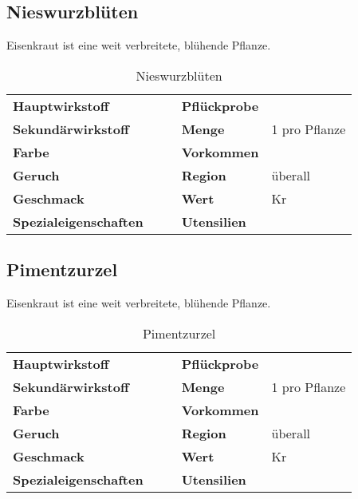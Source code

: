\subsection{Nieswurzblüten}
Eisenkraut ist eine weit verbreitete, blühende Pflanze. 

\begin{table}[h]
\begin{center}
\begin{tabular}{|l|l|p{1cm}|l|l|}
	\cline{1-2} \cline{4-5}
	\textbf{Hauptwirkstoff} &  && \textbf{Pflückprobe} &  \\ \cline{1-2} \cline{4-5}
	\textbf{Sekundärwirkstoff} &  && \textbf{Menge} & 1 pro Pflanze \\ \cline{1-2} \cline{4-5}
	\textbf{Farbe} &  && \textbf{Vorkommen} &  \\ \cline{1-2} \cline{4-5}
	\textbf{Geruch} &  && \textbf{Region} & überall \\ \cline{1-2} \cline{4-5}
	\textbf{Geschmack} &  && \textbf{Wert} & Kr \\ \cline{1-2} \cline{4-5}
	\textbf{Spezialeigenschaften} &  && \textbf{Utensilien} &  \\ \cline{1-2} \cline{4-5}
\end{tabular}
\end{center}
\caption{Nieswurzblüten}
\label{tab:nieswurzblueten}
\end{table}


\subsection{Pimentzurzel}
Eisenkraut ist eine weit verbreitete, blühende Pflanze. 

\begin{table}[h]
\begin{center}
\begin{tabular}{|l|l|p{1cm}|l|l|}
	\cline{1-2} \cline{4-5}
	\textbf{Hauptwirkstoff} &  && \textbf{Pflückprobe} &  \\ \cline{1-2} \cline{4-5}
	\textbf{Sekundärwirkstoff} &  && \textbf{Menge} & 1 pro Pflanze \\ \cline{1-2} \cline{4-5}
	\textbf{Farbe} &  && \textbf{Vorkommen} &  \\ \cline{1-2} \cline{4-5}
	\textbf{Geruch} &  && \textbf{Region} & überall \\ \cline{1-2} \cline{4-5}
	\textbf{Geschmack} &  && \textbf{Wert} & Kr \\ \cline{1-2} \cline{4-5}
	\textbf{Spezialeigenschaften} &  && \textbf{Utensilien} &  \\ \cline{1-2} \cline{4-5}
\end{tabular}
\end{center}
\caption{Pimentzurzel}
\label{tab:pimentzurzel}
\end{table}


